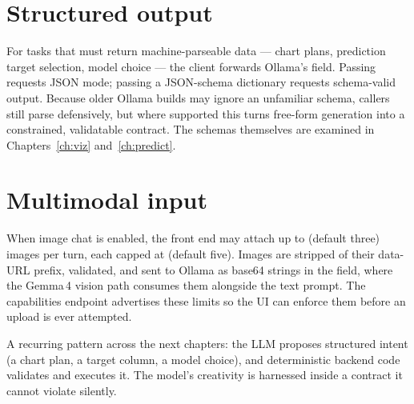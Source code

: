 \section{Structured output}
For tasks that must return machine-parseable data --- chart plans, prediction
target selection, model choice --- the client forwards Ollama's 
field. Passing  requests JSON mode; passing a JSON-schema
dictionary requests schema-valid output. Because older Ollama builds may ignore
an unfamiliar schema, callers still parse defensively, but where supported this
turns free-form generation into a constrained, validatable contract. The schemas
themselves are examined in Chapters~\ref{ch:viz} and~\ref{ch:predict}.

\section{Multimodal input}
When image chat is enabled, the front end may attach up to
 (default three) images per turn, each capped at
 (default five). Images are stripped of their data-URL
prefix, validated, and sent to Ollama as base64 strings in the 
field, where the Gemma\,4 vision path consumes them alongside the text prompt.
The capabilities endpoint advertises these limits so the UI can enforce them
before an upload is ever attempted.

\begin{uanote}
A recurring pattern across the next chapters: the LLM proposes structured
intent (a chart plan, a target column, a model choice), and deterministic
backend code validates and executes it. The model's creativity is harnessed
inside a contract it cannot violate silently.
\end{uanote}
